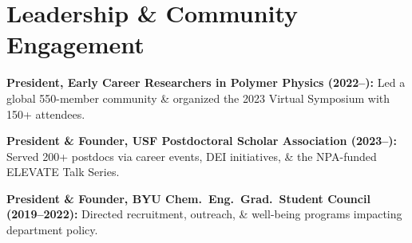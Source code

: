 \documentclass[letterpaper,12pt]{article}
\begin{document}
\vspace{-1.0\baselineskip}
\section*{Leadership \& Community Engagement}
\begin{tabitemize}
  \item \textbf{President, Early Career Researchers in Polymer Physics (2022–):} Led a global 550-member community \& organized the 2023 Virtual Symposium with 150+ attendees.
  \item \textbf{President \& Founder, USF Postdoctoral Scholar Association (2023–):} Served 200+ postdocs via career events, DEI initiatives, \& the NPA-funded ELEVATE Talk Series.
  \item \textbf{President \& Founder, BYU Chem.~Eng.~Grad.~Student Council (2019–2022):} Directed recruitment, outreach, \& well-being programs impacting department policy.
\end{tabitemize}
\end{document}
